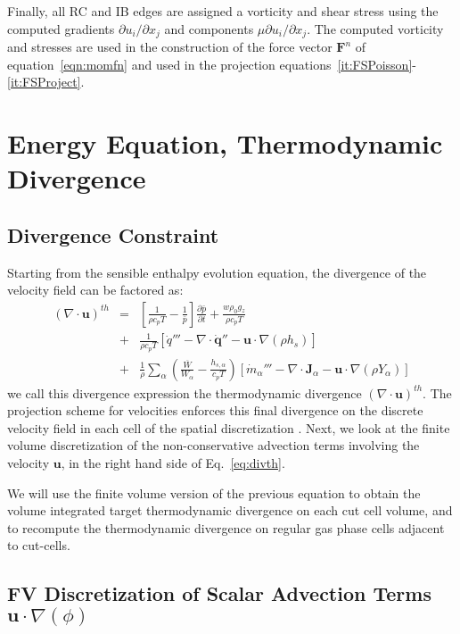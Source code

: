 Finally, all RC and IB edges are assigned a vorticity and shear stress using the computed gradients $\partial u_i/\partial x_j$ and components $\mu \partial u_i/\partial x_j$. The computed vorticity and stresses are used in the construction of the force vector $\mathbf{F}^n$ of equation~\eqref{eqn:momfn} and used in the projection equations~\eqref{it:FSPoisson}-\eqref{it:FSProject}.

\section{Energy Equation, Thermodynamic Divergence}

\subsection{Divergence Constraint}

Starting from the sensible enthalpy evolution equation, the divergence of the velocity field can be factored as:
%
\begin{eqnarray}
    ( \nabla \cdot \mathbf{u} )^{th} &=&
    \left[ \frac{1}{\rho c_p T} - \frac{1}{\bar{p}} \right]
    \frac{\partial \bar{p}}{\partial t} + \frac{w \rho_0 g_z}{\rho c_p T} \nonumber \\
    &+& \frac{1}{\rho c_p T} \left[ \dot{q}''' - \nabla \cdot \dot{\mathbf{q}}'' - \mathbf{u} \cdot \nabla (\rho h_s) \right] \nonumber \\
    &+& \frac{1}{\rho} \sum_\alpha \left( \frac{\overline{W}}{W_\alpha} - \frac{h_{s,\alpha}}{c_p T} \right) \left[ \dot{m}_\alpha''' - \nabla \cdot \mathbf{J}_\alpha - \mathbf{u} \cdot \nabla (\rho Y_\alpha) \right] \label{eq:divth}
\end{eqnarray}
%
we call this divergence expression the thermodynamic divergence $( \nabla \cdot \mathbf{u} )^{th}$. The projection scheme for velocities enforces this final divergence on the discrete velocity field in each cell of the spatial discretization .
Next, we look at the finite volume discretization of the non-conservative advection terms involving the velocity $\mathbf{u}$, in the right hand side of Eq.~\eqref{eq:divth}.

We will use the finite volume version of the previous equation to obtain the volume integrated target thermodynamic divergence on each cut cell volume, and to recompute the thermodynamic divergence on regular gas phase cells adjacent to cut-cells.


\subsection{FV Discretization of Scalar Advection Terms $\mathbf{u} \cdot \nabla (\phi)$}

